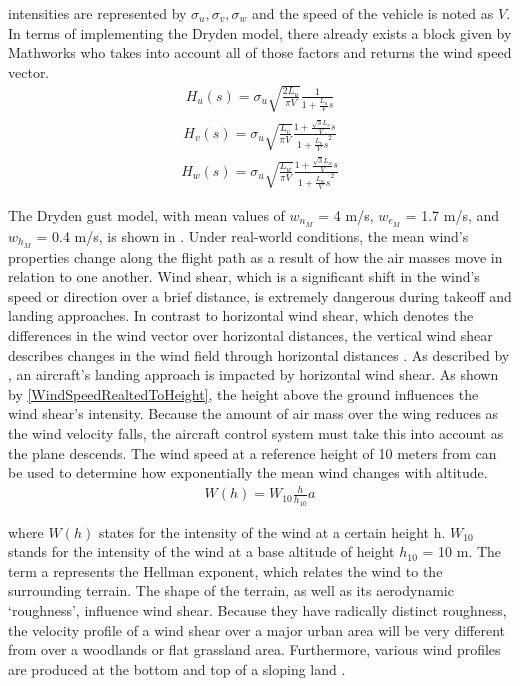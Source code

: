 \documentclass[twocolumn,showpacs,
    nofootinbib,aps,superscriptaddress,
    eqsecnum,prd,showkeys,10pt,floatfix]{revtex4}
\begin{document}
intensities are represented by $\sigma_u, \sigma_v, \sigma_w$ and the speed of
the vehicle is noted as $V$. In terms of implementing the Dryden model, there
already exists a block given by Mathworks who takes into account all of those
factors and returns the wind speed vector.
\begin{align}
    H_u(s)={\sigma_u\sqrt{\frac{2L_u}{\pi V}}}\frac{1}{1+\frac{L_u}{V}s}
\end{align}
\begin{align}
    H_v(s)={\sigma_u\sqrt{\frac{L_v}{\pi V}}}\frac{1+\frac{\sqrt{3}L_v}{V}s}{{1+\frac{L_v}{V}s}^2}
\end{align}
\begin{align}
    H_w(s)={\sigma_u\sqrt{\frac{L_w}{\pi V}}}\frac{1+\frac{\sqrt{3}L_w}{V}s}{{1+\frac{L_w}{V}s}^2}
\end{align}
\par
The Dryden gust model, with mean values of $w_{n_M}$ = 4 m/s, $w_{e_M}$ = 1.7
m/s, and $w_{h_M}$ = 0.4 m/s, is shown in {\cite{UTC}}. Under real-world
conditions, the mean wind's properties change along the flight path as a result
of how the air masses move in relation to one another. Wind shear, which is a
significant shift in the wind's speed or direction over a brief distance, is
extremely dangerous during takeoff and landing
approaches{\cite{Equations_of_Motion}}. In contrast to horizontal wind shear,
which denotes the differences in the wind vector over horizontal distances, the
vertical wind shear describes changes in the wind field through horizontal
distances {\cite{Wind_Sheer}}. As described by {\cite{Wind_Sheer}}, an
aircraft's landing approach is impacted by horizontal wind shear. As shown by
    {\ref{WindSpeedRealtedToHeight}}, the height above the ground influences the
wind shear's intensity. Because the amount of air mass over the wing reduces as
the wind velocity falls, the aircraft control system must take this into
account as the plane descends. The wind speed at a reference height of 10
meters from {\cite{Wind_speed}} can be used to determine how exponentially the
mean wind changes with altitude.
\begin{align}
    W(h)=W_{10}{\frac{h}{h_{10}}}a
    \label{WindSpeedRealtedToHeight}
\end{align}
\par
where $W(h)$ states for the intensity of the wind at a certain height h.
$W_{10}$ stands for the intensity of the wind at a base altitude of height
$h_{10}$ = 10 m. The term a represents the Hellman exponent, which relates the
wind to the surrounding terrain{\cite{UTC}}. The shape of the terrain, as well
as its aerodynamic `roughness', influence wind shear. Because they have
radically distinct roughness, the velocity profile of a wind shear over a major
urban area will be very different from over a woodlands or flat grassland area.
Furthermore, various wind profiles are produced at the bottom and top of a
sloping land {\cite{Wind_profiles}}.
\end{document}

